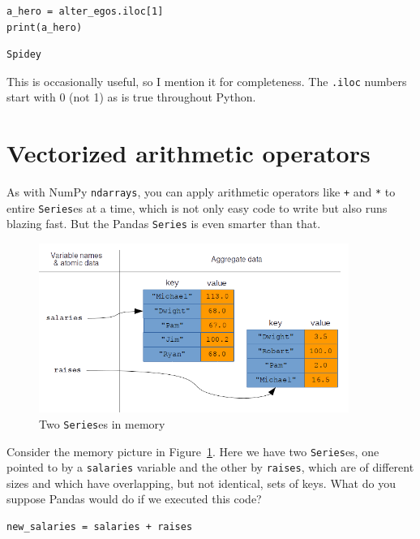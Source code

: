 \begin{Verbatim}[fontsize=\small,samepage=true,frame=single,framesep=3mm]
a_hero = alter_egos.iloc[1]
print(a_hero)
\end{Verbatim}

\begin{Verbatim}[fontsize=\small,samepage=true,frame=leftline,framesep=5mm,framerule=1mm]
Spidey
\end{Verbatim}

This is occasionally useful, so I mention it for completeness. The
\texttt{.iloc} numbers start with 0 (not 1) as is true throughout Python.

\section{Vectorized arithmetic operators}

As with NumPy \texttt{ndarrays}, you can apply arithmetic operators like
\texttt{+} and \texttt{*} to entire \texttt{Series}es at a time, which is not
only easy code to write but also runs blazing fast. But the Pandas
\texttt{Series} is even smarter than that.

\begin{figure}[ht]
\centering
\includegraphics[width=0.9\textwidth]{vectorizedPandas.png}
\caption{Two \texttt{Series}es in memory}
\label{fig:vectorizedPandas}
\end{figure}

Consider the memory picture in Figure~\ref{fig:vectorizedPandas}. Here we have
two \texttt{Series}es, one pointed to by a \texttt{salaries} variable and the
other by \texttt{raises}, which are of different sizes and which have
overlapping, but not identical, sets of keys. What do you suppose Pandas would
do if we executed this code?

\begin{Verbatim}[fontsize=\small,samepage=true,frame=single,framesep=3mm]
new_salaries = salaries + raises
\end{Verbatim}

